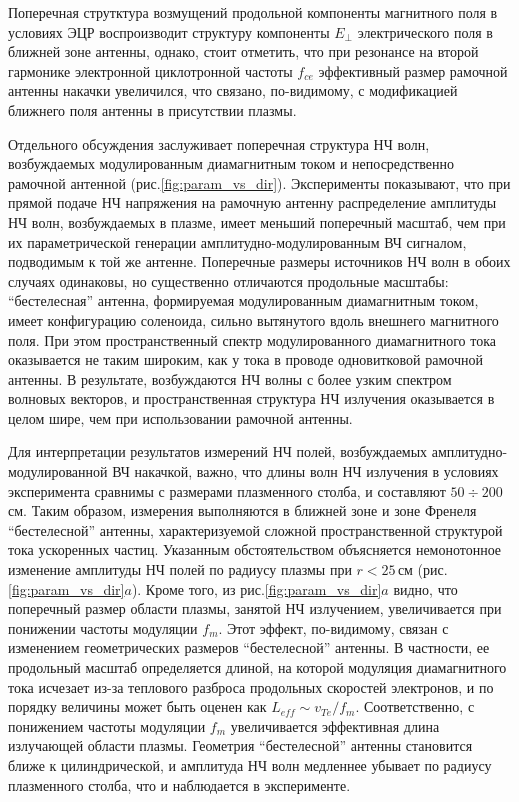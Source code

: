 \documentclass[autoref,10pt]{disser}
\begin{document}
Поперечная струтктура возмущений продольной компоненты магнитного поля в условиях ЭЦР воспроизводит структуру компоненты $E_{\perp}$ электрического поля в ближней зоне антенны, однако, стоит отметить, что при резонансе на второй гармонике электронной циклотронной частоты $f_{ce}$ эффективный размер рамочной антенны накачки увеличился, что связано, по-видимому, с модификацией ближнего поля антенны в присутствии плазмы.

Отдельного обсуждения заслуживает поперечная структура НЧ волн, возбуждаемых модулированным диамагнитным током и непосредственно рамочной антенной (\mbox{рис.\ref{fig:param_vs_dir}}). Эксперименты показывают, что при прямой подаче НЧ напряжения на рамочную антенну распределение амплитуды НЧ волн, возбуждаемых в плазме, имеет меньший поперечный масштаб, чем при их параметрической генерации амплитудно-модулированным ВЧ сигналом, подводимым к той же антенне. Поперечные размеры источников НЧ волн в обоих случаях одинаковы, но существенно отличаются продольные масштабы: ``бестелесная'' антенна, формируемая модулированным диамагнитным током, имеет конфигурацию соленоида, сильно вытянутого вдоль внешнего магнитного поля. При этом пространственный спектр модулированного диамагнитного тока оказывается не таким широким, как у тока в проводе одновитковой рамочной антенны. В результате, возбуждаются НЧ волны с более узким спектром волновых векторов, и пространственная структура НЧ излучения оказывается в целом шире, чем при использовании рамочной антенны.

Для интерпретации результатов измерений  НЧ полей, возбуждаемых амплитудно-модулированной ВЧ накачкой, важно, что длины волн НЧ излучения в условиях эксперимента сравнимы с размерами плазменного столба, и составляют $50\div 200$\,см. Таким образом, измерения выполняются в ближней зоне и зоне Френеля ``бестелесной'' антенны, характеризуемой сложной пространственной структурой тока ускоренных частиц. Указанным обстоятельством объясняется немонотонное изменение амплитуды НЧ полей по радиусу плазмы при $r<25$\,см (\mbox{рис.\ref{fig:param_vs_dir}$a$}). Кроме того, из \mbox{рис.\ref{fig:param_vs_dir}$a$} видно, что поперечный размер области плазмы, занятой НЧ излучением, увеличивается при понижении частоты модуляции $f_m$. Этот эффект, по-видимому, связан с изменением геометрических размеров ``бестелесной'' антенны. В частности, ее продольный масштаб определяется длиной, на которой модуляция диамагнитного тока исчезает из-за теплового разброса продольных скоростей электронов, и по порядку величины может быть оценен как $L_{eff}\sim v_{Te}/f_m$. Соответственно, с понижением частоты модуляции $f_m$ увеличивается эффективная длина излучающей области плазмы. Геометрия ``бестелесной'' антенны становится ближе к цилиндрической, и амплитуда НЧ волн медленнее убывает по радиусу плазменного столба, что и наблюдается в эксперименте.
\end{document}
